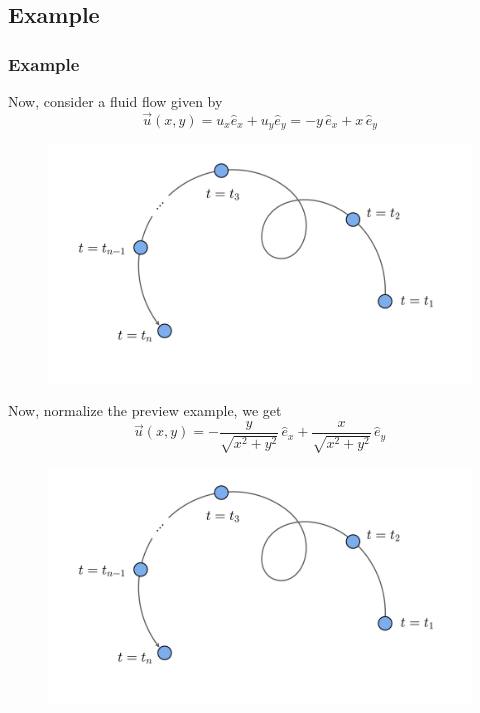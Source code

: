 \documentclass[11pt,]{beamer}
\begin{document}
\subsection{Example}
\begin{frame}
	\frametitle{Example}
	Now, consider a fluid flow given by
	\begin{equation}
	\vec{u}(x,y) = u_x\hat{e}_x + u_y \hat{e}_{y} = -y\,\hat{e}_x + x\,\hat{e}_y
	\end{equation}
	
	\begin{figure}
    \includegraphics[page=7, width=0.9\linewidth]{imgs.pdf}
	\end{figure}
\end{frame}
\begin{frame}
	Now, normalize the preview example, we get
	\begin{equation}
	\vec{u}(x,y) = -\frac{y}{\sqrt{x^2+y^2}}\,\hat{e}_x + \frac{x}{\sqrt{x^2+y^2}}\,\hat{e}_y
	\end{equation}
	
	\begin{figure}
    \includegraphics[page=8, width=0.85\linewidth]{imgs.pdf}
	\end{figure}
\end{frame}
\end{document}
